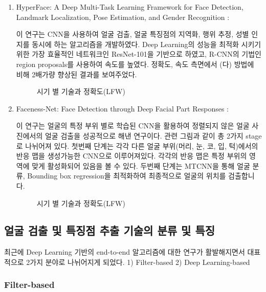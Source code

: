 \documentclass{oblivoir}
\begin{document}
\begin{enumerate}
    \item HyperFace: A Deep Multi-Task Learning Framework for Face Detection, Landmark Localization, Pose Estimation, and Gender Recognition : 

    이 연구는 CNN을 사용하여 얼굴 검출, 얼굴 특징점의 지역화, 행위 추정, 성별 인지를 동시에 하는 알고리즘을 개발하였다. 
    Deep Learning의 성능을 최적화 시키기 위한 가장 효율적인 네트워크인 ResNet-101을 기반으로 하였고, R-CNN의 기법인 region proposals를 사용하여 속도를 높였다. 
    정확도, 속도 측면에서 (다) 방법에 비해 2배가량 향상된 결과를 보여주었다. 

    \begin{figure}[h!]
        \centering
        \caption{시기 별 기술과 정확도(LFW)\cite{reference6}}
    \end{figure}

    \item Faceness-Net: Face Detection through Deep Facial Part Responses : 

    이 연구는 얼굴의 특정 부위 별로 학습된 CNN을 활용하여 정렬되지 않은 얼굴 사진에서의 얼굴 검출을 성공적으로 해낸 연구이다. 
    관련 그림과 같이 총 2가지 stage로 나뉘어져 있다. 첫번째 단계는 각각 다른 얼굴 부위(머리, 눈, 코, 입, 턱)에서의 반응 맵을 생성가능한 CNN으로 이루어져있다. 
    각각의 반응 맵은 특정 부위의 영역에 맞게 활성화되어 있음을 볼 수 있다. 
    두번째 단계는 MTCNN을 통해 얼굴 분류, Bounding box regression을 최적화하여 최종적으로 얼굴의 위치를 검출합니다. 

    \begin{figure}[h!]
        \centering
        \caption{시기 별 기술과 정확도(LFW)\cite{reference6}}
    \end{figure}

\end{enumerate}

\subsection{ 얼굴 검출 및 특징점 추출 기술의 분류 및 특징 }

최근에 Deep Learning 기반의 end-to-end 알고리즘에 대한 연구가 활발해지면서 대표적으로 2가지 분야로 나뉘어지게 되었다. 1) Filter-based 2) Deep Learning-based

\subsubsection{Filter-based}
\end{document}
